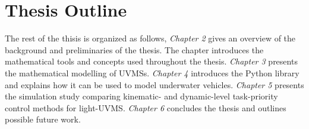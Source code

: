 \section{Thesis Outline}

The rest of the thisis is organized as follows, \emph{Chapter 2} gives an 
overview of the background and preliminaries of the
thesis. The chapter introduces the mathematical tools and concepts used throughout
the thesis. \emph{Chapter 3} presents the mathematical modelling of UVMSs.
\emph{Chapter 4} introduces the Python library
\pymuvs{} and explains how it can be used to model underwater vehicles. \emph{Chapter 5}
presents the simulation study comparing kinematic- and dynamic-level task-priority
control methods for light-UVMS. \emph{Chapter 6} concludes the thesis and outlines
possible future work.
